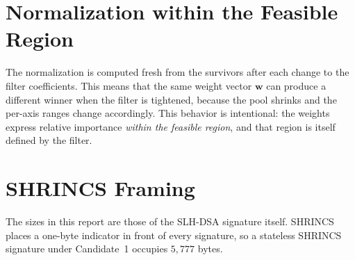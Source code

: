 \section{Normalization within the Feasible Region} \label{app:normalization}
The normalization is computed fresh from the survivors after each change to the filter coefficients.
This means that the same weight vector $\mathbf{w}$ can produce a different winner when the filter is tightened, because the pool shrinks and the per-axis ranges change accordingly.
This behavior is intentional: the weights express relative importance \emph{within the feasible region}, and that region is itself defined by the filter.

\section{SHRINCS Framing} \label{app:framing}
The sizes in this report are those of the SLH-DSA signature itself. SHRINCS places a one-byte indicator in front of every signature, so a stateless SHRINCS signature under Candidate~1 occupies $5{,}777$ bytes.

